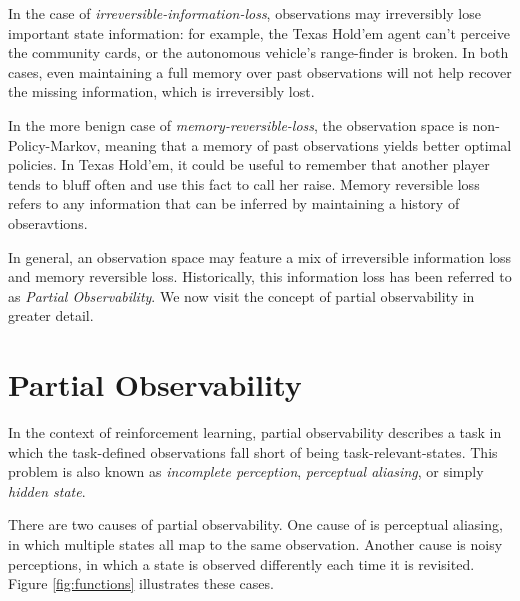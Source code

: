 \documentclass{article} %
\theoremstyle{definition}
\begin{document}
In the case of \textit{irreversible-information-loss}, observations
may irreversibly lose important state information: for example, the
Texas Hold'em agent can't perceive the community cards, or the
autonomous vehicle's range-finder is broken. In both cases, even
maintaining a full memory over past observations will not help recover
the missing information, which is irreversibly lost.

In the more benign case of \textit{memory-reversible-loss}, the
observation space is non-Policy-Markov, meaning that a memory of past
observations yields better optimal policies. In Texas Hold'em, it
could be useful to remember that another player tends to bluff often
and use this fact to call her raise. Memory reversible loss refers to
any information that can be inferred by maintaining a history of
obseravtions.

In general, an observation space may feature a mix of irreversible
information loss and memory reversible loss. Historically, this
information loss has been referred to as \textit{Partial
  Observability}. We now visit the concept of partial observability in
greater detail.

\section{Partial Observability}
In the context of reinforcement learning, partial observability
describes a task in which the task-defined observations fall short of
being task-relevant-states. This problem is also known as
\textit{incomplete perception}, \textit{perceptual aliasing}, or
simply \textit{hidden state}.

There are two causes of partial observability. One cause of is
perceptual aliasing, in which multiple states all map to the same
observation. Another cause is noisy perceptions, in which a state is
observed differently each time it is revisited. Figure
\ref{fig:functions} illustrates these cases.
\end{document}
